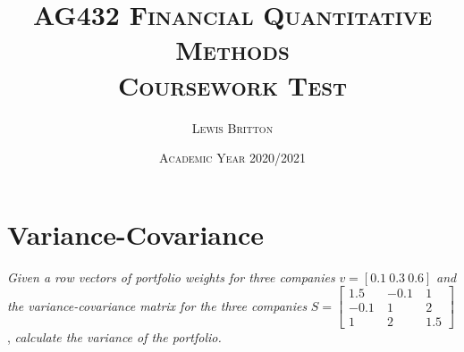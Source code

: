 \documentclass[11pt, english]{article}
\begin{document}

        \title{\textsc{AG432 Financial Quantitative Methods\\ Coursework Test}}
        \author{\textsc{Lewis Britton}}
        \date{\textsc{Academic Year 2020/2021}}
        \maketitle

\newpage


        \renewcommand{\contentsname}{Table of Contents}

        \tableofcontents

\newpage


\section{Variance-Covariance}

	\textit{Given a row vectors of portfolio weights for three companies} $v=[0.1\ 0.3\ 0.6]$ \textit{and the variance-covariance matrix for the three companies} $S=\left[\begin{matrix}1.5\\-0.1\\1\end{matrix}\ \begin{matrix}-0.1\\1\\2\end{matrix}\ \begin{matrix}1\\2\\1.5\end{matrix}\right]$, \textit{calculate the variance of the portfolio.}
\end{document}
